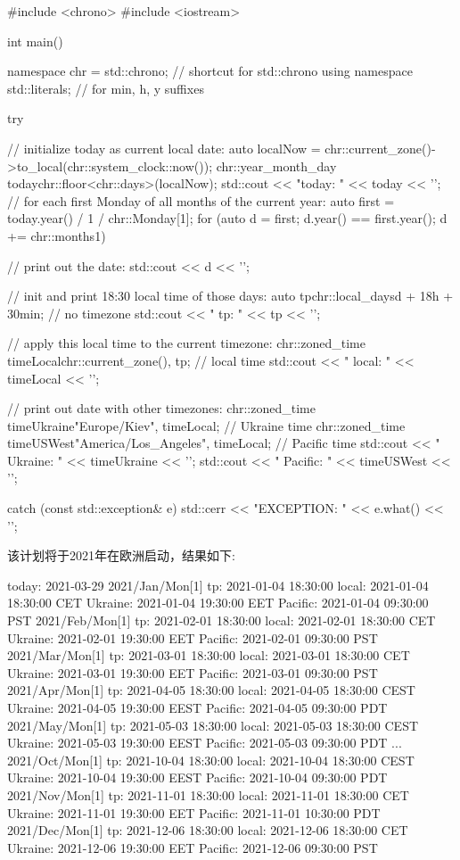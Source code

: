\begin{cpp}
#include <chrono>
#include <iostream>

int main()
{
	namespace chr = std::chrono; // shortcut for std::chrono
	using namespace std::literals; // for min, h, y suffixes
	
	try {
		// initialize today as current local date:
		auto localNow = chr::current_zone()->to_local(chr::system_clock::now());
		chr::year_month_day today{chr::floor<chr::days>(localNow)};
		std::cout << "today: " << today << '\n';
		// for each first Monday of all months of the current year:
		auto first = today.year() / 1 / chr::Monday[1];
		for (auto d = first; d.year() == first.year(); d += chr::months{1}) {
			// print out the date:
			std::cout << d << '\n';
			
			// init and print 18:30 local time of those days:
			auto tp{chr::local_days{d} + 18h + 30min}; // no timezone
			std::cout << " tp: " << tp << '\n';
			
			// apply this local time to the current timezone:
			chr::zoned_time timeLocal{chr::current_zone(), tp}; // local time
			std::cout << " local: " << timeLocal << '\n';
			
			// print out date with other timezones:
			chr::zoned_time timeUkraine{"Europe/Kiev", timeLocal}; // Ukraine time
			chr::zoned_time timeUSWest{"America/Los_Angeles", timeLocal}; // Pacific time
			std::cout << " Ukraine: " << timeUkraine << '\n';
			std::cout << " Pacific: " << timeUSWest << '\n';
		}
	}
	catch (const std::exception& e) {
		std::cerr << "EXCEPTION: " << e.what() << '\n';
	}
}
\end{cpp}

该计划将于2021年在欧洲启动，结果如下:

\begin{shell}
today: 2021-03-29
2021/Jan/Mon[1]
    tp:      2021-01-04 18:30:00
    local:   2021-01-04 18:30:00 CET
    Ukraine: 2021-01-04 19:30:00 EET
    Pacific: 2021-01-04 09:30:00 PST
2021/Feb/Mon[1]
    tp:      2021-02-01 18:30:00
    local:   2021-02-01 18:30:00 CET
    Ukraine: 2021-02-01 19:30:00 EET
    Pacific: 2021-02-01 09:30:00 PST
2021/Mar/Mon[1]
    tp:      2021-03-01 18:30:00
    local:   2021-03-01 18:30:00 CET
    Ukraine: 2021-03-01 19:30:00 EET
    Pacific: 2021-03-01 09:30:00 PST
2021/Apr/Mon[1]
    tp:      2021-04-05 18:30:00
    local:   2021-04-05 18:30:00 CEST
    Ukraine: 2021-04-05 19:30:00 EEST
    Pacific: 2021-04-05 09:30:00 PDT
2021/May/Mon[1]
    tp:      2021-05-03 18:30:00
    local:   2021-05-03 18:30:00 CEST
    Ukraine: 2021-05-03 19:30:00 EEST
    Pacific: 2021-05-03 09:30:00 PDT
...
2021/Oct/Mon[1]
    tp:      2021-10-04 18:30:00
    local:   2021-10-04 18:30:00 CEST
    Ukraine: 2021-10-04 19:30:00 EEST
    Pacific: 2021-10-04 09:30:00 PDT
2021/Nov/Mon[1]
    tp:      2021-11-01 18:30:00
    local:   2021-11-01 18:30:00 CET
    Ukraine: 2021-11-01 19:30:00 EET
    Pacific: 2021-11-01 10:30:00 PDT
2021/Dec/Mon[1]
    tp:      2021-12-06 18:30:00
    local:   2021-12-06 18:30:00 CET
    Ukraine: 2021-12-06 19:30:00 EET
    Pacific: 2021-12-06 09:30:00 PST
\end{shell}

